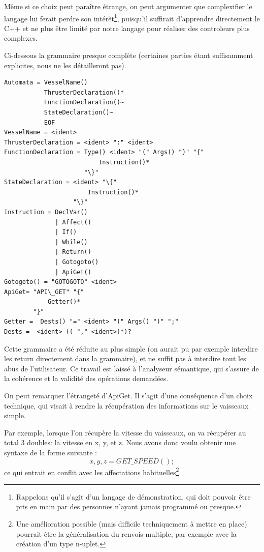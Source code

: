 \documentclass[a4paper,11pt]{article}
\begin{document}
        Même si ce choix peut paraître étrange, on peut argumenter que complexifier le langage lui ferait perdre son intérêt\footnote{Rappelons qu'il s'agit d'un langage de démonstration, qui doit pouvoir être pris en main par des personnes n'ayant jamais programmé ou presque.}, puisqu'il suffirait d'apprendre directement le C++ et ne plus être limité par notre langage pour réaliser des controleurs plus complexes.
        
        Ci-dessous la grammaire presque complète (certaines parties étant suffisamment explicites, nous ne les détailleront pas).

        \begin{Verbatim}[frame=single]
Automata = VesselName()
           ThrusterDeclaration()*
           FunctionDeclaration()~
           StateDeclaration()~
           EOF
VesselName = <ident>
ThrusterDeclaration = <ident> ":" <ident>
FunctionDeclaration = Type() <ident> "(" Args() ")" "{"
                          Instruction()*  
                      "\}"  
StateDeclaration = <ident> "\{"
                       Instruction()* 
                   "\}" 
Instruction = DeclVar()
              | Affect()
              | If() 
              | While() 
              | Return()
              | Gotogoto() 
              | ApiGet() 
Gotogoto() = "GOTOGOTO" <ident>
ApiGet= "API\_GET" "{" 
            Getter()*
        "}"
Getter =  Dests() "=" <ident> "(" Args() ")" ";"
Dests =  <ident> (( "," <ident>)*)?
        \end{Verbatim}

        Cette grammaire a été réduite au plus simple (on aurait pu par exemple interdire les return directement dans la grammaire), et ne suffit pas à interdire tout les abus de l'utilisateur. Ce travail est laissé à l'analyseur sémantique, qui s'assure de la cohérence et la validité des opérations demandées.
        
        On peut remarquer l'étrangeté d'ApiGet. Il s'agit d'une conséquence d'un choix technique, qui visait à rendre la récupération des informations sur le vaisseaux simple. 
        
        Par exemple, lorsque l'on récupère la vitesse du vaisseaux, on va récupérer au total 3 doubles: la vitesse en x, y, et z. Nous avons donc voulu obtenir une syntaxe de la forme suivante : \[ x,y,z = GET\_SPEED(); \] ce qui entrait en conflit avec les affectations habituelles\footnote{Une amélioration possible (mais difficile techniquement à mettre en place) pourrait être la généralisation du renvois multiple, par exemple avec la création d'un type n-uplet.}.
        
\end{document}
